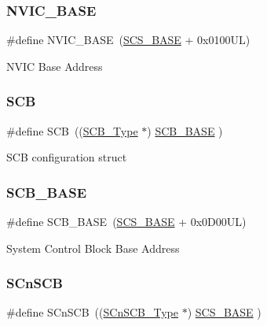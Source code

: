 \subsubsection{\texorpdfstring{NVIC\_BASE}{NVIC\_BASE}}
{\footnotesize\ttfamily \#define N\+V\+I\+C\+\_\+\+B\+A\+SE~(\mbox{\hyperlink{group__CMSIS__core__base_ga3c14ed93192c8d9143322bbf77ebf770}{S\+C\+S\+\_\+\+B\+A\+SE}} +  0x0100\+U\+L)}

N\+V\+IC Base Address \mbox{\label{group__CMSIS__core__base_gaaaf6477c2bde2f00f99e3c2fd1060b01}} 
\subsubsection{\texorpdfstring{SCB}{SCB}}
{\footnotesize\ttfamily \#define S\+CB~((\mbox{\hyperlink{structSCB__Type}{S\+C\+B\+\_\+\+Type}}       $\ast$)     \mbox{\hyperlink{group__CMSIS__core__base_gad55a7ddb8d4b2398b0c1cfec76c0d9fd}{S\+C\+B\+\_\+\+B\+A\+SE}}      )}

S\+CB configuration struct \mbox{\label{group__CMSIS__core__base_gad55a7ddb8d4b2398b0c1cfec76c0d9fd}} 
\subsubsection{\texorpdfstring{SCB\_BASE}{SCB\_BASE}}
{\footnotesize\ttfamily \#define S\+C\+B\+\_\+\+B\+A\+SE~(\mbox{\hyperlink{group__CMSIS__core__base_ga3c14ed93192c8d9143322bbf77ebf770}{S\+C\+S\+\_\+\+B\+A\+SE}} +  0x0\+D00\+U\+L)}

System Control Block Base Address \mbox{\label{group__CMSIS__core__base_ga9fe0cd2eef83a8adad94490d9ecca63f}} 
\subsubsection{\texorpdfstring{SCnSCB}{SCnSCB}}
{\footnotesize\ttfamily \#define S\+Cn\+S\+CB~((\mbox{\hyperlink{structSCnSCB__Type}{S\+Cn\+S\+C\+B\+\_\+\+Type}}    $\ast$)     \mbox{\hyperlink{group__CMSIS__core__base_ga3c14ed93192c8d9143322bbf77ebf770}{S\+C\+S\+\_\+\+B\+A\+SE}}      )}

